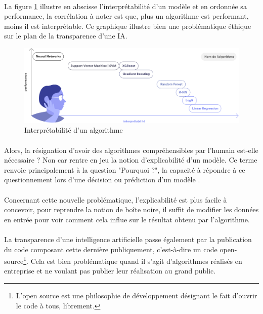 \documentclass[10pt, french, a4paper]{report}
\begin{document}
\paragraph{}
La figure \ref{fig:interpretabilite_ia} illustre en abscisse l’interprétabilité d’un modèle et en ordonnée sa performance, la corrélation à noter est que, plus un algorithme est performant, moins il est interprétable. Ce graphique illustre bien une problématique éthique sur le plan de la transparence d’une IA.

\begin{figure}[hbt!]
    \centering
    \includegraphics[width=\textwidth]{images/interpretabilite_ia.png}
    \caption{Interprétabilité d'un algorithme \citep{data_for_good_serment_2018}}
    \label{fig:interpretabilite_ia}
\end{figure}

\paragraph{}
Alors, la résignation d’avoir des algorithmes compréhensibles par l’humain est-elle nécessaire ? Non car rentre en jeu la notion d’explicabilité d’un modèle. Ce terme renvoie principalement à la question "Pourquoi ?", la capacité à répondre à ce questionnement lors d’une décision ou prédiction d’un modèle \citep{gilpin_explaining_2018}.

\paragraph{}
Concernant cette nouvelle problématique, l’explicabilité est plus facile à concevoir, pour reprendre la notion de boîte noire, il suffit de modifier les données en entrée pour voir comment cela influe sur le résultat obtenu par l’algorithme.

\paragraph{}
La transparence d’une intelligence artificielle passe également par la publication du code composant cette dernière publiquement, c’est-à-dire un code open-source\footnote{L’open source est une philosophie de développement désignant le fait d’ouvrir le code à tous, librement.}. Cela est bien problématique quand il s’agit d’algorithmes réalisés en entreprise et ne voulant pas publier leur réalisation au grand public.
\end{document}

